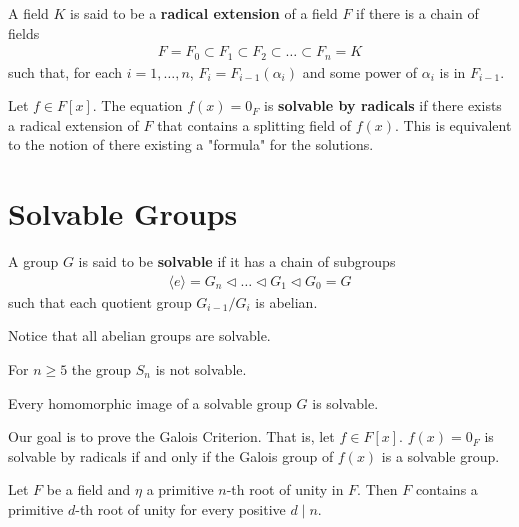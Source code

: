 \documentclass{memoir}
\begin{document}


\begin{defn}
	A field \(K\) is said to be a \textbf{radical extension} of a field \(F\) if there is a chain of fields
	\begin{align*}
		F = F_0 \subset F_1 \subset F_2 \subset \ldots\subset F_n = K
	\end{align*}
	such that, for each \(i=1,\ldots,n\), \(F_i = F_{i-1}(\alpha_i)\) and some power of \(\alpha_i\) is in \(F_{i-1}\).
\end{defn}
Let \(f \in F[x]\). The equation \(f(x) = 0_F\) is \textbf{solvable by radicals} if there exists a radical extension of \(F\) that contains a splitting field of \(f(x)\). This is equivalent to the notion of there existing a "formula" for the solutions.

\section{Solvable Groups}
\label{sec:solvable_groups}

\begin{defn}[Solvable]
	A group \(G\) is said to be \textbf{solvable} if it has a chain of subgroups
	\begin{align*}
		\langle e \rangle = G_n \triangleleft \ldots \triangleleft G_1 \triangleleft G_0 = G
	\end{align*}
	such that each quotient group \(G_{i-1} / G_i\) is abelian.
\end{defn}
Notice that all abelian groups are solvable.
\begin{prop}
	For \(n\geq 5\) the group \(S_n\) is not solvable.
\end{prop}
\begin{thm}
	Every homomorphic image of a solvable group \(G\) is solvable.
\end{thm}

Our goal is to prove the Galois Criterion. That is, let \(f \in F[x]\). \(f(x) = 0_F\) is solvable by radicals if and only if the Galois group of \(f(x)\) is a solvable group.

\begin{lemma}
	Let \(F\) be a field and \(\eta \) a primitive \(n\)-th root of unity in \(F\). Then \(F\) contains a primitive \(d\)-th root of unity for every positive \(d\mid n\).
\end{lemma}
\end{document}
